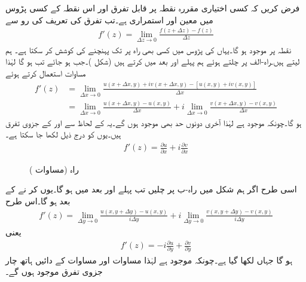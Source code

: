 فرض کریں کہ  کسی اختیاری مقررہ نقطہ  پر قابل تفرق اور اس نقطہ کے کسی پڑوس میں معین اور استمراری ہے۔تب تفرق کی تعریف کی رو سے
\begin{align}\label{مساوات_مخلوط_کوشی_ریمان_ثبوت_ب}
f'(z)=\lim_{\Delta z\to 0}\frac{f(z+\Delta z)-f(z)}{\Delta z}
\end{align} 
نقطہ  پر موجود ہو گا۔یہاں  کی پڑوس میں  کسی بھی راہ پر   تک پہنچنے کی کوشش کر سکتا ہے۔  ہم  لیتے ہیں۔راہ-الف پر چلتے ہوئے ہم پہلے  اور بعد میں  کرتے ہیں (شکل )۔جب  ہو جائے تب  ہو گا لہٰذا مساوات  استعمال کرتے ہوئے
\begin{align*}
f'(z)&=\lim_{\Delta x\to 0}\frac{u(x+\Delta x,y)+iv(x+\Delta x,y)-[u(x,y)+iv(x,y)]}{\Delta x}\\
&=\lim_{\Delta x\to 0}\frac{u(x+\Delta x,y)-u(x,y)}{\Delta x}+i\lim_{\Delta x\to 0}\frac{v(x+\Delta x,y)-v(x,y)}{\Delta x}
\end{align*}
ہو گا۔چونکہ  موجود ہے لہٰذا آخری دونوں حد بھی موجود ہوں گے۔یہ  کے لحاظ سے  اور  کے جزوی تفرق ہیں۔یوں  کو درج ذیل لکھا جا سکتا ہے۔
\begin{align}\label{مساوات_مخلوط_کوشی_ریمان_ثبوت_پ}
f'(z)=\frac{\partial u}{\partial x}+i\frac{\partial v}{\partial x}
\end{align}
%
\begin{figure}
\centering
{}
\caption{راہ (مساوات )}
\label{شکل_مساوات_مخلوط_کوشی_ریمان_ثبوت_ب}
\end{figure}
اسی طرح اگر ہم شکل  میں راہ-ب پر چلیں تب پہلے  اور بعد میں  ہو گا۔یوں  کر نے کے بعد  ہو گا۔اس طرح 
\begin{align*}
f'(z)=\lim_{\Delta y\to 0} \frac{u(x,y+\Delta y)-u(x,y)}{i\Delta y}+i\lim_{\Delta y\to 0} \frac{v(x,y+\Delta y)-v(x,y)}{i\Delta y}
\end{align*}
یعنی
\begin{align}\label{مساوات_مخلوط_کوشی_ریمان_ثبوت_ت}
f'(z)=-i\frac{\partial u}{\partial y}+\frac{\partial v}{\partial y}
\end{align}
ہو گا جہاں  لکھا گیا ہے۔چونکہ   موجود ہے لہٰذا  مساوات  اور مساوات  کے دائیں ہاتھ چار جزوی تفرق موجود ہوں گے۔

